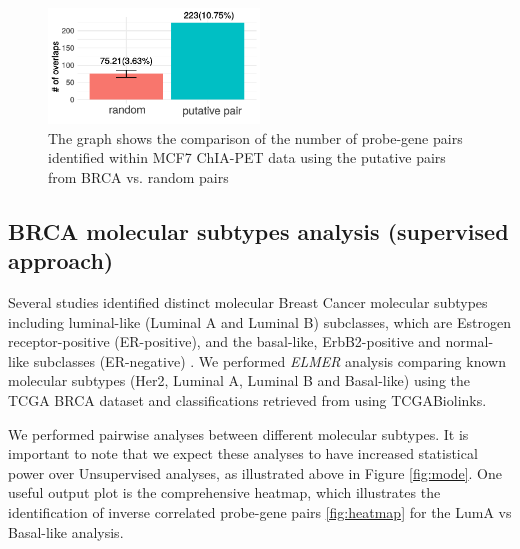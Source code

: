 \begin{figure}
\centering
\includegraphics[width=0.5\textwidth]{images/mcf7.pdf}
\caption[MCF7 ChIA-PET validation]{\label{fig:chiapet} The graph shows the comparison of the number of probe-gene pairs identified within MCF7 ChIA-PET data using the putative pairs from BRCA vs. random pairs}
\end{figure}

\subsection{BRCA molecular subtypes analysis (supervised approach)}


Several studies identified distinct molecular Breast Cancer molecular subtypes including luminal-like (Luminal A and Luminal B) subclasses, which are Estrogen receptor-positive (ER-positive), and the basal-like, ErbB2-positive and normal-like subclasses (ER-negative) \cite{perou2000molecular,yersal2014biological,sorlie2001gene}. We performed \textit{ELMER} analysis comparing known molecular subtypes (Her2, Luminal A, Luminal B and Basal-like) using the TCGA BRCA dataset and classifications retrieved from \cite{ciriello2015comprehensive} using TCGABiolinks.

We performed pairwise analyses between different molecular subtypes. It is important to note that we expect these analyses to have increased statistical power over Unsupervised analyses, as illustrated above in Figure \ref{fig:mode}. One useful output plot is the comprehensive heatmap, 
which illustrates the identification of inverse correlated probe-gene pairs \ref{fig:heatmap} for the LumA vs Basal-like analysis.  

